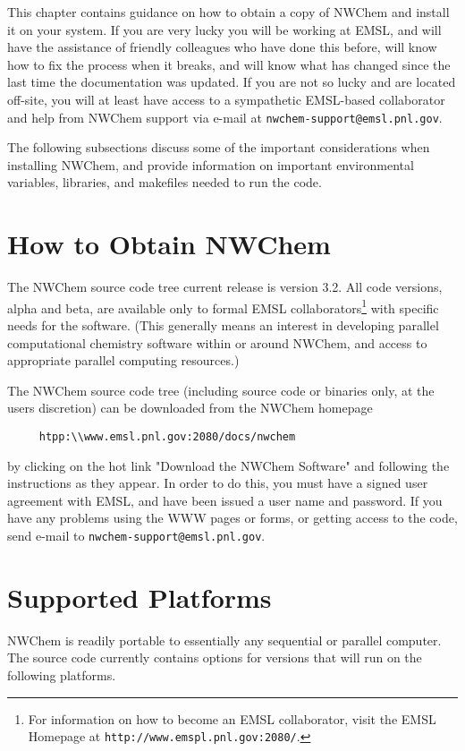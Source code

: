 \label{sec:install}

This chapter contains guidance on how to obtain a copy of NWChem and
install it on your system.  If you are very lucky you will be working
at EMSL, and will have the assistance of friendly colleagues who have
done this before, will know how to fix the process when it breaks,
and will know what has changed since the last time the documentation
was updated.
If you are not so lucky and are located off-site, you will at least have
access to a sympathetic EMSL-based collaborator and help from NWChem 
support via e-mail at {\tt nwchem-support@emsl.pnl.gov}.

The following subsections discuss some of the important considerations
when installing NWChem, and provide information on important environmental
variables, libraries, and makefiles needed to run the code.

\section{How to Obtain NWChem}

The NWChem source code tree current release is version 3.2.  All code versions, alpha and
beta, are available only to formal EMSL collaborators\footnote{For information on
how to become an EMSL collaborator, visit the EMSL Homepage at 
\verb+http://www.emspl.pnl.gov:2080/+.} with specific
needs for the software.  (This generally means an interest in developing
parallel computational chemistry software within or around NWChem, and
access to appropriate parallel computing resources.)

The NWChem source code tree (including source code or binaries only, at the
users discretion) can be downloaded from the NWChem homepage 

\begin{verbatim}
     htpp:\\www.emsl.pnl.gov:2080/docs/nwchem
\end{verbatim}

by clicking on the hot link "Download the NWChem Software" and following the
instructions as they appear.  In order to do this, you must have a signed user agreement
with EMSL, and have been issued a user name and password.  If you have any problems
using the WWW pages or forms, or getting access to the code, send e-mail to
{\tt nwchem-support@emsl.pnl.gov}.

\section{Supported Platforms}
\label{sec:platforms}
NWChem is readily portable to essentially any sequential or parallel computer.  
The source code currently contains options for versions that will run
on the following platforms.

